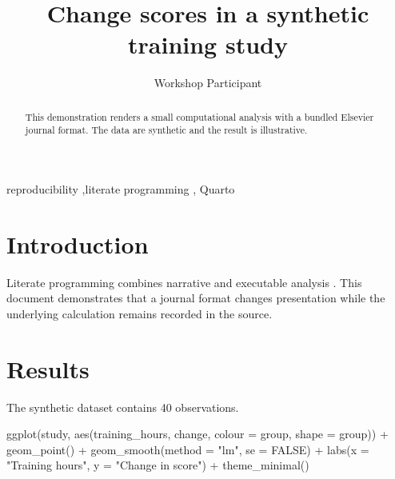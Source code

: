 \documentclass[
  number]{elsarticle}
\newenvironment{Shaded}{\begin{snugshade}}{\end{snugshade}}
\newcommand{\AttributeTok}[1]{\textcolor[rgb]{0.40,0.45,0.13}{#1}}
\newcommand{\ConstantTok}[1]{\textcolor[rgb]{0.56,0.35,0.01}{#1}}
\newcommand{\FunctionTok}[1]{\textcolor[rgb]{0.28,0.35,0.67}{#1}}
\newcommand{\NormalTok}[1]{\textcolor[rgb]{0.00,0.23,0.31}{#1}}
\newcommand{\SpecialCharTok}[1]{\textcolor[rgb]{0.37,0.37,0.37}{#1}}
\newcommand{\StringTok}[1]{\textcolor[rgb]{0.13,0.47,0.30}{#1}}
\begin{document}
\begin{frontmatter}
\title{Change scores in a synthetic training study}
\author[1]{Workshop Participant%
%
}




        
\begin{abstract}
This demonstration renders a small computational analysis with a bundled
Elsevier journal format. The data are synthetic and the result is
illustrative.
\end{abstract}





\begin{keyword}
    reproducibility \sep literate programming \sep 
    Quarto
\end{keyword}
\end{frontmatter}
    

\section{Introduction}\label{introduction}

Literate programming combines narrative and executable analysis
\citep{knuth1984}. This document demonstrates that a journal format
changes presentation while the underlying calculation remains recorded
in the source.

\section{Results}\label{results}

The synthetic dataset contains 40 observations.

\begin{Shaded}
\begin{Highlighting}[]
\FunctionTok{ggplot}\NormalTok{(study, }\FunctionTok{aes}\NormalTok{(training\_hours, change, }\AttributeTok{colour =}\NormalTok{ group, }\AttributeTok{shape =}\NormalTok{ group)) }\SpecialCharTok{+}
  \FunctionTok{geom\_point}\NormalTok{() }\SpecialCharTok{+}
  \FunctionTok{geom\_smooth}\NormalTok{(}\AttributeTok{method =} \StringTok{"lm"}\NormalTok{, }\AttributeTok{se =} \ConstantTok{FALSE}\NormalTok{) }\SpecialCharTok{+}
  \FunctionTok{labs}\NormalTok{(}\AttributeTok{x =} \StringTok{"Training hours"}\NormalTok{, }\AttributeTok{y =} \StringTok{"Change in score"}\NormalTok{) }\SpecialCharTok{+}
  \FunctionTok{theme\_minimal}\NormalTok{()}
\end{Highlighting}
\end{Shaded}
\end{document}
